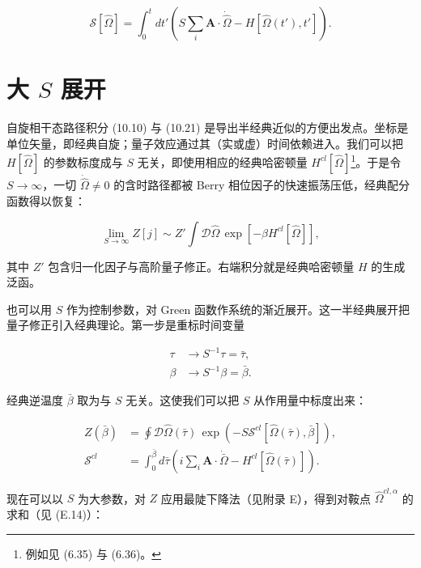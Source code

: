 \begin{equation*}
\mathcal {S} [ \hat {\Omega} ] = \int_ {0} ^ {t} d t ' \left( S \sum_ {i} \mathbf {A} \cdot \dot {\hat {\Omega}} - H [ \hat {\Omega} ( t ' ), t ' ] \right).
\tag{10.22}
\end{equation*}

\section{大 $S$ 展开}

自旋相干态路径积分 (10.10) 与 (10.21) 是导出半经典近似的方便出发点。坐标是单位矢量，即经典自旋；量子效应通过其（实或虚）时间依赖进入。我们可以把 $H[\hat{\Omega}]$ 的参数标度成与 $S$ 无关，即使用相应的经典哈密顿量 $H^{cl}[\hat{\Omega}]$\footnote{例如见 (6.35) 与 (6.36)。}。于是令 $S \to \infty$，一切 $\dot{\hat{\Omega}} \neq 0$ 的含时路径都被 Berry 相位因子的快速振荡压低，经典配分函数得以恢复：

\begin{equation*}
\lim _ {S \to \infty} Z [ j ] \sim Z ' \int \mathcal {D} \hat {\Omega} \, \exp \left[ - \beta H ^ {cl} [ \hat {\Omega} ] \right] ,
\tag{10.23}
\end{equation*}

其中 $Z'$ 包含归一化因子与高阶量子修正。右端积分就是经典哈密顿量 $H$ 的生成泛函。

也可以用 $S$ 作为控制参数，对 Green 函数作系统的渐近展开。这一半经典展开把量子修正引入经典理论。第一步是重标时间变量

\begin{align*}
\tau & \rightarrow S ^ {- 1} \tau = \bar {\tau} ,\\
\beta & \rightarrow S ^ {- 1} \beta = \bar {\beta} .
\tag{10.24}
\end{align*}

经典逆温度 $\bar{\beta}$ 取为与 $S$ 无关。这使我们可以把 $S$ 从作用量中标度出来：

\begin{align*}
Z ( \bar {\beta} ) & = \oint \mathcal {D} \hat {\Omega} ( \bar {\tau} ) \, \exp \left( - S \mathcal {S} ^ {cl} [ \hat {\Omega} ( \bar {\tau} ), \bar {\beta} ] \right) ,\\
\mathcal {S} ^ {cl} & = \int_ {0} ^ {\bar {\beta}} d \bar {\tau} \left( i \sum_ {i} \mathbf {A} \cdot \dot {\bar {\Omega}} - H ^ {cl} [ \hat {\Omega} ( \bar {\tau} ) ] \right) .
\tag{10.25}
\end{align*}

现在可以以 $S$ 为大参数，对 $Z$ 应用最陡下降法（见附录 E），得到对鞍点 $\hat{\Omega}^{cl,\alpha}$ 的求和（见 (E.14)）：

